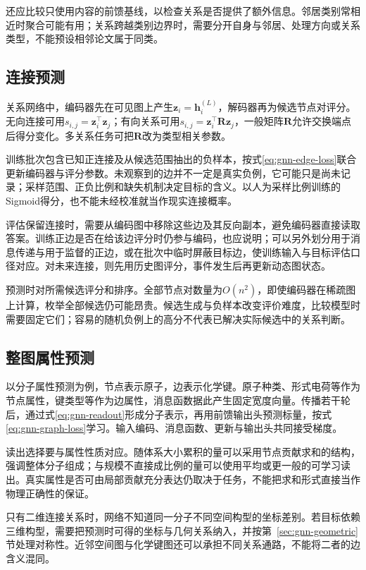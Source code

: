 还应比较只使用内容的前馈基线，以检查关系是否提供了额外信息。邻居类别常相近时聚合可能有用；关系跨越类别边界时，需要分开自身与邻居、处理方向或关系类型，不能预设相邻论文属于同类。

\subsection{连接预测}
\label{sec:gnn-application-link}

关系网络中，编码器先在可见图上产生$\bm{z}_i=\bm{h}_i^{(L)}$，解码器再为候选节点对评分。无向连接可用$s_{i,j}=\bm{z}_i^{\top}\bm{z}_j$；有向关系可用$s_{i,j}=\bm{z}_i^{\top}\bm{R}\bm{z}_j$，一般矩阵$\bm{R}$允许交换端点后得分变化。多关系任务可把$\bm{R}$改为类型相关参数。

训练批次包含已知正连接及从候选范围抽出的负样本，按式\eqref{eq:gnn-edge-loss}联合更新编码器与评分参数。未观察到的边并不一定是真实负例，它可能只是尚未记录；采样范围、正负比例和缺失机制决定目标的含义。以人为采样比例训练的Sigmoid得分，也不能未经校准就当作现实连接概率。

评估保留连接时，需要从编码图中移除这些边及其反向副本，避免编码器直接读取答案。训练正边是否在给该边评分时仍参与编码，也应说明；可以另外划分用于消息传递与用于监督的正边，或在批次中临时屏蔽目标边，使训练输入与目标评估口径对应。对未来连接，则先用历史图评分，事件发生后再更新动态图状态。

预测时对所需候选评分和排序。全部节点对数量为$O(n^2)$，即使编码器在稀疏图上计算，枚举全部候选仍可能昂贵。候选生成与负样本改变评价难度，比较模型时需要固定它们；容易的随机负例上的高分不代表已解决实际候选中的关系判断。

\subsection{整图属性预测}
\label{sec:gnn-application-graph}

以分子属性预测为例，节点表示原子，边表示化学键。原子种类、形式电荷等作为节点属性，键类型等作为边属性，消息函数据此产生固定宽度向量。传播若干轮后，通过式\eqref{eq:gnn-readout}形成分子表示，再用前馈输出头预测标量，按式\eqref{eq:gnn-graph-loss}学习。输入编码、消息函数、更新与输出头共同接受梯度。

读出选择要与属性性质对应。随体系大小累积的量可以采用节点贡献求和的结构，强调整体分子组成；与规模不直接成比例的量可以使用平均或更一般的可学习读出。真实属性是否可由局部贡献充分表达仍取决于任务，不能把求和形式直接当作物理正确性的保证。

只有二维连接关系时，网络不知道同一分子不同空间构型的坐标差别。若目标依赖三维构型，需要把预测时可得的坐标与几何关系纳入，并按第~\ref{sec:gnn-geometric}节处理对称性。近邻空间图与化学键图还可以承担不同关系通路，不能将二者的边含义混同。

